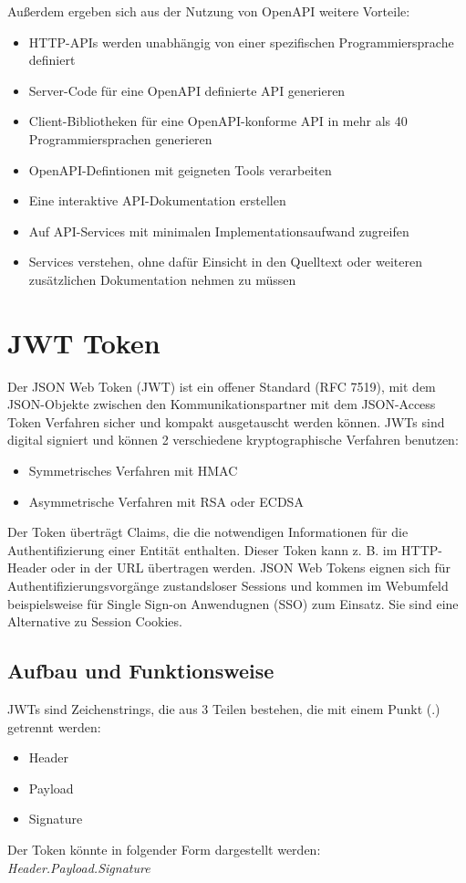 Außerdem ergeben sich aus der Nutzung von OpenAPI weitere Vorteile:
\begin{itemize}
    \item HTTP-APIs werden unabhängig von einer spezifischen Programmiersprache definiert
    \item Server-Code für eine OpenAPI definierte API generieren
    \item Client-Bibliotheken für eine OpenAPI-konforme API in mehr als 40 Programmiersprachen generieren
    \item OpenAPI-Defintionen mit geigneten Tools verarbeiten
    \item Eine interaktive API-Dokumentation erstellen
    \item Auf API-Services mit minimalen Implementationsaufwand zugreifen
    \item Services verstehen, ohne dafür Einsicht in den Quelltext oder weiteren zusätzlichen Dokumentation nehmen zu müssen
\end{itemize}

\section{JWT Token}
Der JSON Web Token (JWT) ist ein offener Standard (RFC 7519), mit dem JSON-Objekte zwischen den Kommunikationspartner mit dem JSON-Access Token Verfahren 
sicher und kompakt ausgetauscht werden können. JWTs sind digital signiert und können 2 verschiedene kryptographische Verfahren benutzen:
\begin{itemize}
    \item Symmetrisches Verfahren mit HMAC
    \item Asymmetrische Verfahren mit RSA oder ECDSA
\end{itemize}

Der Token überträgt Claims, die die notwendigen Informationen für die Authentifizierung einer Entität enthalten. 
Dieser Token kann z. B. im HTTP-Header oder in der URL übertragen werden. JSON Web Tokens eignen sich für Authentifizierungsvorgänge zustandsloser Sessions und kommen 
im Webumfeld beispielsweise für Single Sign-on Anwendugnen (SSO) zum Einsatz. Sie sind eine Alternative zu Session Cookies. 

\subsection{Aufbau und Funktionsweise}
JWTs sind Zeichenstrings, die aus 3 Teilen bestehen, die mit einem Punkt (.) getrennt werden:
\begin{itemize}
    \item Header
    \item Payload
    \item Signature
\end{itemize}
Der Token könnte in folgender Form dargestellt werden: \textit{Header.Payload.Signature}

